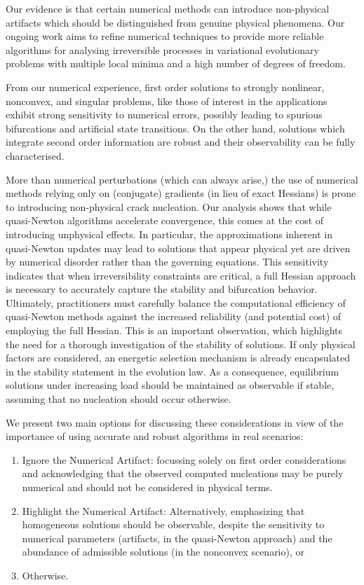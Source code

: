\documentclass[10pt]{article}
\begin{document}
Our evidence is that certain numerical methods can introduce non-physical artifacts which should be distinguished from genuine physical phenomena. Our ongoing work aims to refine numerical techniques to provide more reliable algorithms for analysing irreversible processes in variational evolutionary problems with multiple local minima and a high number of degrees of freedom.

From our numerical experience, first order solutions to strongly nonlinear, nonconvex, and singular problems, like those of interest in the applications exhibit strong sensitivity to numerical errors, possibly leading to spurious bifurcations and artificial state transitions. On the other hand, solutions which integrate second order information are robust and their observability can be fully characterised.

More than numerical perturbations (which can always arise,) the use of numerical methods relying only on (conjugate) gradients (in lieu of exact Hessians) is prone to introducing non-physical crack nucleation.
    {Our analysis shows that while quasi-Newton algorithms accelerate convergence, this comes at the cost of introducing unphysical effects. In particular, the approximations inherent in quasi-Newton updates may lead to solutions that appear physical yet are driven by numerical disorder rather than the governing equations.
        This sensitivity indicates that when irreversibility constraints are critical, a full Hessian approach is  necessary to accurately capture the stability and bifurcation behavior.
        Ultimately, practitioners must carefully balance the computational efficiency of quasi-Newton methods against the increased reliability (and potential cost) of employing the full Hessian.}
This is an important observation, which highlights the need for a thorough investigation of the stability of solutions.
If only physical factors are considered, an energetic selection mechanism is already encapsulated in the stability statement in the evolution law. As a consequence, equilibrium solutions under increasing load should be maintained as observable if stable, assuming that no nucleation should occur otherwise.

We present two main options for discussing these considerations in view of the importance of using accurate and robust algorithms in real scenarios:

\begin{enumerate}
    \item
          Ignore the Numerical Artifact: focussing solely on first order considerations and acknowledging that the observed computed nucleations may be purely numerical and should not be considered in physical terms.
    \item
          Highlight the Numerical Artifact: Alternatively, emphasizing that homogeneous solutions should be observable, despite
          the sensitivity to numerical parameters (artifacts, in the quasi-Newton approach) and the abundance of admissible solutions (in the nonconvex scenario), or
    \item
          Otherwise.
\end{enumerate}
\end{document}
